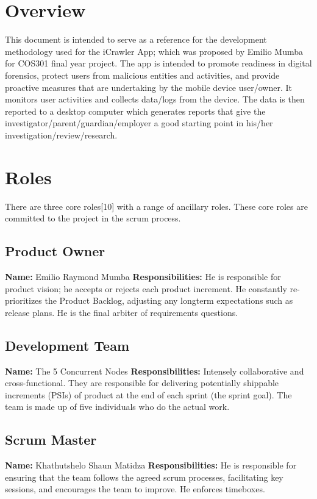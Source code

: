 \documentclass[hidelinks, 12pt, oneside]{article}
\begin{document}
	
	
	\tableofcontents
	\newpage
	
	\section{Overview}
	This document is intended to serve as a reference for the development methodology used for the iCrawler App; which was proposed 
	by Emilio Mumba for COS301 final year project.\newline\newline
	The app is intended to promote readiness in digital forensics, protect users from malicious entities and activities, and provide proactive 
	measures that are undertaking by the mobile device user/owner. It monitors user activities and collects data/logs from the device. The data
	is then reported to a desktop computer which generates reports that give the investigator/parent/guardian/employer a good starting point in his/her investigation/review/research.\newpage
	
	\section{Roles}
	There are three core roles[10] with a range of ancillary roles. These core roles are committed to the project in the scrum process.
	\subsection{Product Owner}
	\textbf{Name:} Emilio Raymond Mumba\newline
	\textbf{Responsibilities:} He is responsible for product vision; he accepts or rejects each product increment. He constantly re-prioritizes the Product Backlog, adjusting any longterm expectations such as release plans. He is the final arbiter of requirements questions.
 	\subsection{Development Team}
 	\textbf{Name:} The 5 Concurrent Nodes\newline
	\textbf{Responsibilities:} Intensely collaborative and cross-functional. They are responsible for delivering potentially shippable increments (PSIs) of product at the end of each sprint (the sprint goal). 
	The team
	is made up of five individuals who do the actual work.
	\subsection{Scrum Master}
 	\textbf{Name:} Khathutshelo Shaun Matidza\newline
	\textbf{Responsibilities:} He is responsible for ensuring that the team follows the agreed scrum processes, facilitating key sessions, and encourages 
	the team to improve. He enforces timeboxes.\newpage
	
\end{document}
